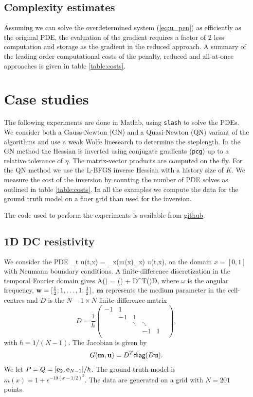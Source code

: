 \documentclass{iopart}
\begin{document}
\subsection{Complexity estimates}
Assuming we can solve the overdetermined system (\ref{eq:u_pen}) as efficiently as
the original PDE, the evaluation of the gradient requires a factor of 2 less
computation and storage as the gradient in the reduced approach. 
A summary of the leading order computational costs of the penalty, reduced and all-at-once approaches is given in table \ref{table:costs}.

\section{Case studies}
\label{examples}
The following experiments are done in Matlab, using \texttt{slash} to solve the PDEs. We consider both
a Gauss-Newton (GN) and a Quasi-Newton (QN) variant of the algorithms and use a weak Wolfe linesearch
to determine the steplength. In the GN method the Hessian is inverted using 
conjugate gradients (\texttt{pcg}) up to a relative tolerance of $\eta$. The matrix-vector products are computed on the fly.
For the QN method we use the L-BFGS inverse Hessian with a history size of $K$. 
We measure the cost of the inversion by counting the number of PDE solves as outlined in table \ref{table:costs}.
In all the examples we compute the data for the ground truth model on a finer grid than used for the inversion.

The code used to perform the experiments is available from \url{github}.

\subsection{1D DC resistivity}
We consider the PDE
\bq
\partial_t u(t,x) = \partial_x\left(m(x)\partial_x\right) u(t,x),
\eq
on the domain $x = [0,1]$ with Neumann boundary conditions. 
A finite-difference discretization in the temporal Fourier domain gives
\bq
A() = \imath\omega{}() + D^T()D,
\eq
where $\omega$ is the angular frequency, $\mbf{w} = [\frac{1}{2}; 1, \ldots, 1; \frac{1}{2}]$, $\mbf{m}$ represents 
the medium parameter in the cell-centres and $D$ is the $N-1\times N$ finite-difference matrix
\[
D=\frac{1}{h}\left(\begin{array}{cccccc} 
-1& 1&   &  &      &   \\
  &-1& 1 &  &      &   \\
  &  &\ddots&\ddots&   \\
  &  &      & -1   & 1 \\
\end{array}\right),
\]
with $h=1/(N-1)$. The Jacobian is given by 
\[
G(\mbf{m},\mbf{u}) = D^T\mathsf{diag}(D\mbf{u}).
\]
We let $P = Q = [\mbf{e}_2, \mbf{e}_{N-1}]/h$.
The ground-truth model is $m(x) = 1+e^{-10(x-1/2)^2}$. The data are generated on a grid with $N=201$ points.
\end{document}
